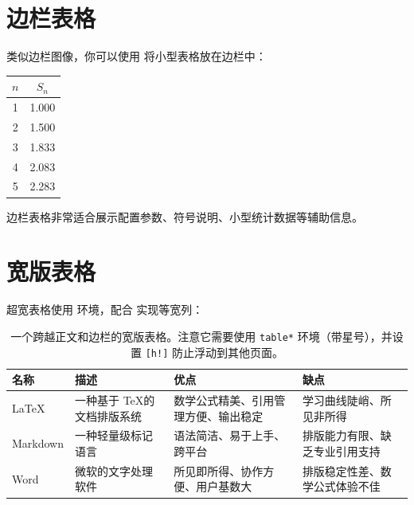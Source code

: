\section{边栏表格}

类似边栏图像，你可以使用  将小型表格放在边栏中：

\begin{margintable}
    \caption[边栏表格]{参数设置。}
    \begin{tabular}{c c}
        \toprule
        $n$ & $S_n$ \\
        \midrule
        1   & 1.000 \\
        2   & 1.500 \\
        3   & 1.833 \\
        4   & 2.083 \\
        5   & 2.283 \\
        \bottomrule
    \end{tabular}
\end{margintable}

边栏表格非常适合展示配置参数、符号说明、小型统计数据等辅助信息。

\section{宽版表格}

超宽表格使用  环境，配合  实现等宽列：

\begin{table}[h!]
    \caption[宽版表格示例]{一个跨越正文和边栏的宽版表格。注意它需要使用
    \texttt{table*} 环境（带星号），并设置 \texttt{[h!]} 防止浮动到其他页面。}
    \begin{tabularx}{\textwidth}{l X X X}
        \toprule
        名称   & 描述 & 优点 & 缺点 \\
        \midrule
        \LaTeX  & 一种基于 \TeX 的文档排版系统 & 
            数学公式精美、引用管理方便、输出稳定 &
            学习曲线陡峭、所见非所得 \\
        Markdown & 一种轻量级标记语言 &
            语法简洁、易于上手、跨平台 &
            排版能力有限、缺乏专业引用支持 \\
        Word    & 微软的文字处理软件 &
            所见即所得、协作方便、用户基数大 &
            排版稳定性差、数学公式体验不佳 \\
        \bottomrule
    \end{tabularx}
\end{table}

